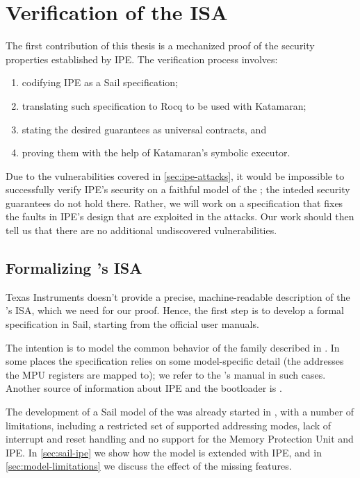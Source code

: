 \chapter{Verification of the \texorpdfstring{\msp}{MSP430} ISA}

The first contribution of this thesis is a mechanized proof of the security properties established by IPE. The verification process involves:
\begin{enumerate}
\item codifying IPE as a Sail specification;
\item translating such specification to Rocq to be used with Katamaran;
\item stating the desired guarantees as universal contracts, and
\item proving them with the help of Katamaran's symbolic executor.
\end{enumerate}

Due to the vulnerabilities covered in \cref{sec:ipe-attacks}, it would be impossible to successfully verify IPE's security on a faithful model of the \msp; the inteded security guarantees do not hold there. Rather, we will work on a specification that fixes the faults in IPE's design that are exploited in the attacks. Our work should then tell us that there are no additional undiscovered vulnerabilities.

\section{Formalizing \texorpdfstring{\msp}{MSP430}'s ISA}

Texas Instruments doesn't provide a precise, machine-readable description of the \msp's ISA, which we need for our proof. Hence, the first step is to develop a formal specification in Sail, starting from the official user manuals.

The intention is to model the common behavior of the family described in \cite{slau367p}. In some places the specification relies on some model-specific detail (\eg the addresses the MPU registers are mapped to); we refer to the \msp[FR5969]'s manual \cite{slas704g} in such cases. Another source of information about IPE and the bootloader is \cite{slaa685}.

The development of a Sail model of the \msp was already started in \cite{mspthesis}, with a number of limitations, including a restricted set of supported addressing modes, lack of interrupt and reset handling and no support for the Memory Protection Unit and IPE. In \cref{sec:sail-ipe} we show how the model is extended with IPE, and in \cref{sec:model-limitations} we discuss the effect of the missing features.

